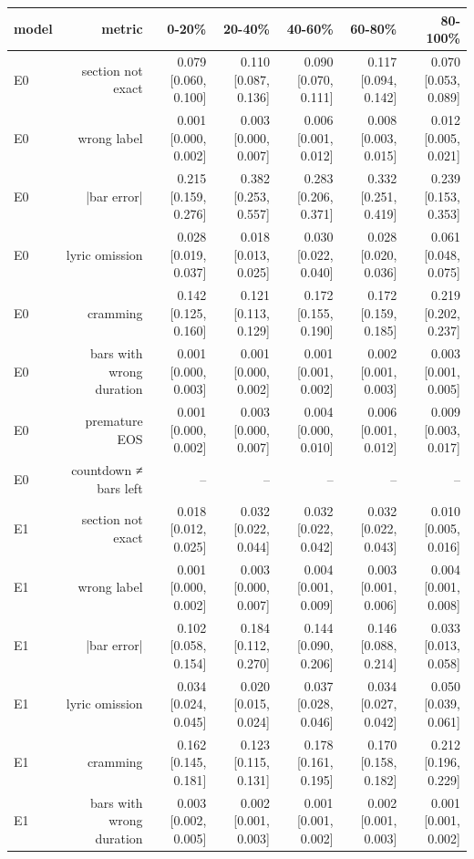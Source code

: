 \begin{table}[t]
\centering
\small
\begin{tabular}{lrrrrrr}
\toprule
model & metric & 0-20\% & 20-40\% & 40-60\% & 60-80\% & 80-100\% \\
\midrule
E0 & section not exact & 0.079 [0.060, 0.100] & 0.110 [0.087, 0.136] & 0.090 [0.070, 0.111] & 0.117 [0.094, 0.142] & 0.070 [0.053, 0.089] \\
E0 & wrong label & 0.001 [0.000, 0.002] & 0.003 [0.000, 0.007] & 0.006 [0.001, 0.012] & 0.008 [0.003, 0.015] & 0.012 [0.005, 0.021] \\
E0 & |bar error| & 0.215 [0.159, 0.276] & 0.382 [0.253, 0.557] & 0.283 [0.206, 0.371] & 0.332 [0.251, 0.419] & 0.239 [0.153, 0.353] \\
E0 & lyric omission & 0.028 [0.019, 0.037] & 0.018 [0.013, 0.025] & 0.030 [0.022, 0.040] & 0.028 [0.020, 0.036] & 0.061 [0.048, 0.075] \\
E0 & cramming & 0.142 [0.125, 0.160] & 0.121 [0.113, 0.129] & 0.172 [0.155, 0.190] & 0.172 [0.159, 0.185] & 0.219 [0.202, 0.237] \\
E0 & bars with wrong duration & 0.001 [0.000, 0.003] & 0.001 [0.000, 0.002] & 0.001 [0.001, 0.002] & 0.002 [0.001, 0.003] & 0.003 [0.001, 0.005] \\
E0 & premature EOS & 0.001 [0.000, 0.002] & 0.003 [0.000, 0.007] & 0.004 [0.000, 0.010] & 0.006 [0.001, 0.012] & 0.009 [0.003, 0.017] \\
E0 & countdown ≠ bars left & – & – & – & – & – \\
E1 & section not exact & 0.018 [0.012, 0.025] & 0.032 [0.022, 0.044] & 0.032 [0.022, 0.042] & 0.032 [0.022, 0.043] & 0.010 [0.005, 0.016] \\
E1 & wrong label & 0.001 [0.000, 0.002] & 0.003 [0.000, 0.007] & 0.004 [0.001, 0.009] & 0.003 [0.001, 0.006] & 0.004 [0.001, 0.008] \\
E1 & |bar error| & 0.102 [0.058, 0.154] & 0.184 [0.112, 0.270] & 0.144 [0.090, 0.206] & 0.146 [0.088, 0.214] & 0.033 [0.013, 0.058] \\
E1 & lyric omission & 0.034 [0.024, 0.045] & 0.020 [0.015, 0.024] & 0.037 [0.028, 0.046] & 0.034 [0.027, 0.042] & 0.050 [0.039, 0.061] \\
E1 & cramming & 0.162 [0.145, 0.181] & 0.123 [0.115, 0.131] & 0.178 [0.161, 0.195] & 0.170 [0.158, 0.182] & 0.212 [0.196, 0.229] \\
E1 & bars with wrong duration & 0.003 [0.002, 0.005] & 0.002 [0.001, 0.003] & 0.001 [0.001, 0.002] & 0.002 [0.001, 0.003] & 0.001 [0.001, 0.002] \\

\end{tabular}
\end{table}
